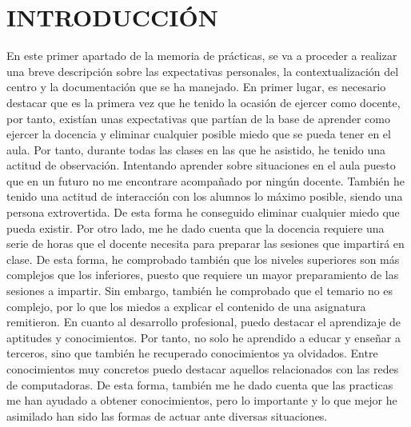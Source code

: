 \documentclass[spanish,12pt, a4paper,twoside]{paper}
\let\oldsection\section
\def\section{\cleardoublepage\oldsection}
\newcommand\blankpage{%
    \null
    \thispagestyle{empty}%
    \addtocounter{page}{-1}%
    \newpage}
\begin{document}


\afterpage{\blankpage}


\tableofcontents %


\newpage
{} 



\section{INTRODUCCIÓN} %
\justify
En este primer apartado de la memoria de prácticas, se va a proceder a realizar una breve descripción sobre las expectativas personales, la contextualización del centro y la documentación que se ha manejado.
\justify
En primer lugar, es necesario destacar que es la primera vez que he tenido la ocasión de ejercer como docente, por tanto, existían unas expectativas que partían de la base de aprender como ejercer la docencia y eliminar cualquier posible miedo que se pueda tener en el aula. Por tanto, durante todas las clases en las que he asistido, he tenido una actitud de observación. Intentando aprender sobre situaciones en el aula puesto que en un futuro no me encontrare acompañado por ningún docente. También he tenido una actitud de interacción con los alumnos lo máximo posible, siendo una persona extrovertida. De esta forma he conseguido eliminar cualquier miedo que pueda existir.
\justify
Por otro lado, me he dado cuenta que la docencia requiere una serie de horas que el docente necesita para preparar las sesiones que impartirá en clase. De esta forma, he comprobado también que los niveles superiores son más complejos que los inferiores, puesto que requiere un mayor preparamiento de las sesiones a impartir. Sin embargo, también he comprobado que el temario no es complejo, por lo que los miedos a explicar el contenido de una asignatura remitieron.
\justify
En cuanto al desarrollo profesional, puedo destacar el aprendizaje de aptitudes y conocimientos. Por tanto, no solo he aprendido a educar y enseñar a terceros, sino que también he recuperado conocimientos ya olvidados. Entre conocimientos muy concretos puedo destacar aquellos relacionados con las redes de computadoras. De esta forma, también me he dado cuenta que las practicas me han ayudado a obtener conocimientos, pero lo importante y lo que mejor he asimilado han sido las formas de actuar ante diversas situaciones.
\end{document}
